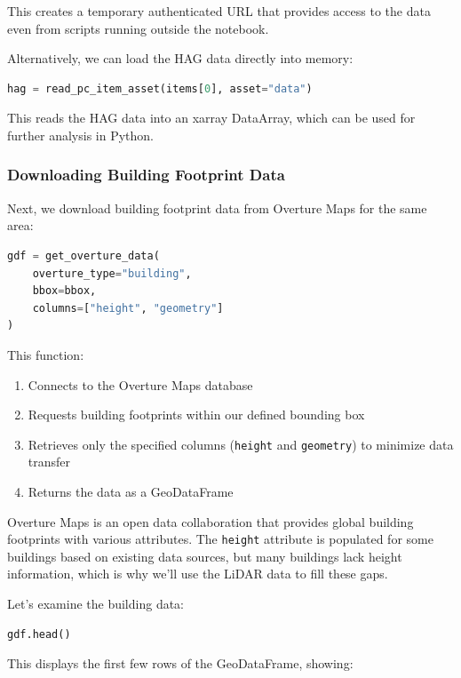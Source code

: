 This creates a temporary authenticated URL that provides access to the data even from scripts running outside the notebook.

Alternatively, we can load the HAG data directly into memory:

\begin{lstlisting}[language=Python]
hag = read_pc_item_asset(items[0], asset="data")
\end{lstlisting}

This reads the HAG data into an xarray DataArray, which can be used for further analysis in Python.

\subsubsection{Downloading Building Footprint Data}

Next, we download building footprint data from Overture Maps for the same area:

\begin{lstlisting}[language=Python]
gdf = get_overture_data(
    overture_type="building",
    bbox=bbox,
    columns=["height", "geometry"]
)
\end{lstlisting}

This function:

\begin{enumerate}
\item Connects to the Overture Maps database
\item Requests building footprints within our defined bounding box
\item Retrieves only the specified columns (\texttt{height} and \texttt{geometry}) to minimize data transfer
\item Returns the data as a GeoDataFrame
\end{enumerate}

Overture Maps is an open data collaboration that provides global building footprints with various attributes. The \texttt{height} attribute is populated for some buildings based on existing data sources, but many buildings lack height information, which is why we'll use the LiDAR data to fill these gaps.

Let's examine the building data:

\begin{lstlisting}[language=Python]
gdf.head()
\end{lstlisting}

This displays the first few rows of the GeoDataFrame, showing:


